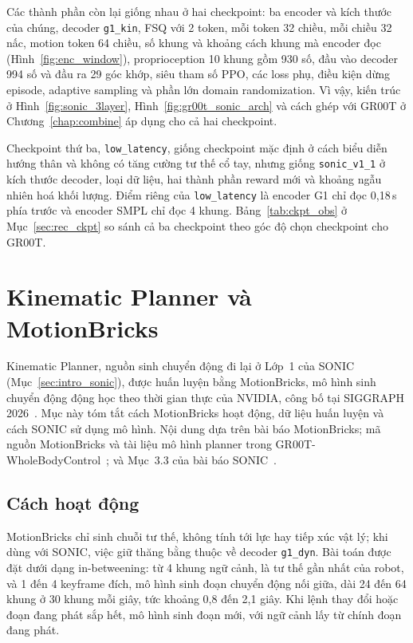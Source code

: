 \documentclass[12pt,a4paper,oneside]{report}
\newcommand{\code}[1]{\texttt{#1}}
\begin{document}
Các thành phần còn lại giống nhau ở hai checkpoint: ba encoder và kích thước của chúng, decoder \code{g1\_kin}, FSQ với 2 token, mỗi token 32 chiều, mỗi chiều 32 nấc, motion token 64 chiều, số khung và khoảng cách khung mà encoder đọc (Hình~\ref{fig:enc_window}), proprioception 10 khung gồm 930 số, đầu vào decoder 994 số và đầu ra 29 góc khớp, siêu tham số PPO, các loss phụ, điều kiện dừng episode, adaptive sampling và phần lớn domain randomization. Vì vậy, kiến trúc ở Hình~\ref{fig:sonic_3layer}, Hình~\ref{fig:gr00t_sonic_arch} và cách ghép với GR00T ở Chương~\ref{chap:combine} áp dụng cho cả hai checkpoint.

Checkpoint thứ ba, \code{low\_latency}, giống checkpoint mặc định ở cách biểu diễn hướng thân và không có tăng cường tư thế cổ tay, nhưng giống \code{sonic\_v1\_1} ở kích thước decoder, loại dữ liệu, hai thành phần reward mới và khoảng ngẫu nhiên hoá khối lượng. Điểm riêng của \code{low\_latency} là encoder G1 chỉ đọc 0,18\,s phía trước và encoder SMPL chỉ đọc 4 khung. Bảng~\ref{tab:ckpt_obs} ở Mục~\ref{sec:rec_ckpt} so sánh cả ba checkpoint theo góc độ chọn checkpoint cho GR00T.

\section{Kinematic Planner và MotionBricks}
\label{sec:motionbricks}

Kinematic Planner, nguồn sinh chuyển động đi lại ở Lớp~1 của SONIC (Mục~\ref{sec:intro_sonic}), được huấn luyện bằng MotionBricks, mô hình sinh chuyển động động học theo thời gian thực của NVIDIA, công bố tại SIGGRAPH 2026~\cite{motionbricks}. Mục này tóm tắt cách MotionBricks hoạt động, dữ liệu huấn luyện và cách SONIC sử dụng mô hình. Nội dung dựa trên bài báo MotionBricks; mã nguồn MotionBricks và tài liệu mô hình planner trong GR00T-WholeBodyControl~\cite{wbc}; và Mục~3.3 của bài báo SONIC~\cite{sonic}.

\subsection{Cách hoạt động}
\label{sec:mb_arch}

MotionBricks chỉ sinh chuỗi tư thế, không tính tới lực hay tiếp xúc vật lý; khi dùng với SONIC, việc giữ thăng bằng thuộc về decoder \code{g1\_dyn}. Bài toán được đặt dưới dạng in-betweening: từ 4 khung ngữ cảnh, là tư thế gần nhất của robot, và 1 đến 4 keyframe đích, mô hình sinh đoạn chuyển động nối giữa, dài 24 đến 64 khung ở 30 khung mỗi giây, tức khoảng 0,8 đến 2,1 giây. Khi lệnh thay đổi hoặc đoạn đang phát sắp hết, mô hình sinh đoạn mới, với ngữ cảnh lấy từ chính đoạn đang phát.
\end{document}
